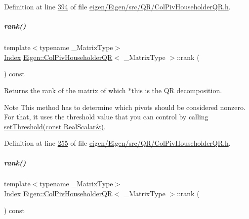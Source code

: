 Definition at line \hyperlink{eigen_2_eigen_2src_2_q_r_2_col_piv_householder_q_r_8h_source_l00394}{394} of file \hyperlink{eigen_2_eigen_2src_2_q_r_2_col_piv_householder_q_r_8h_source}{eigen/\+Eigen/src/\+Q\+R/\+Col\+Piv\+Householder\+Q\+R.\+h}.

\mbox{\label{group___q_r___module_a2a59aaa689613ce5ef0c9130ad33940e}} 
\subparagraph{\texorpdfstring{rank()}{rank()}\hspace{0.1cm}{\footnotesize\ttfamily [1/2]}}
{\footnotesize\ttfamily template$<$typename \+\_\+\+Matrix\+Type$>$ \\
\hyperlink{namespace_eigen_a62e77e0933482dafde8fe197d9a2cfde}{Index} \hyperlink{group___q_r___module_class_eigen_1_1_col_piv_householder_q_r}{Eigen\+::\+Col\+Piv\+Householder\+QR}$<$ \+\_\+\+Matrix\+Type $>$\+::rank (\begin{DoxyParamCaption}{ }\end{DoxyParamCaption}) const\hspace{0.3cm}{\ttfamily [inline]}}

\begin{DoxyReturn}{Returns}
the rank of the matrix of which $\ast$this is the QR decomposition.
\end{DoxyReturn}
\begin{DoxyNote}{Note}
This method has to determine which pivots should be considered nonzero. For that, it uses the threshold value that you can control by calling \hyperlink{group___q_r___module_ae712cdc9f0e521cfc8061bee58ff55ee}{set\+Threshold(const Real\+Scalar\&)}. 
\end{DoxyNote}


Definition at line \hyperlink{eigen_2_eigen_2src_2_q_r_2_col_piv_householder_q_r_8h_source_l00255}{255} of file \hyperlink{eigen_2_eigen_2src_2_q_r_2_col_piv_householder_q_r_8h_source}{eigen/\+Eigen/src/\+Q\+R/\+Col\+Piv\+Householder\+Q\+R.\+h}.

\mbox{\label{group___q_r___module_a2a59aaa689613ce5ef0c9130ad33940e}} 
\subparagraph{\texorpdfstring{rank()}{rank()}\hspace{0.1cm}{\footnotesize\ttfamily [2/2]}}
{\footnotesize\ttfamily template$<$typename \+\_\+\+Matrix\+Type$>$ \\
\hyperlink{namespace_eigen_a62e77e0933482dafde8fe197d9a2cfde}{Index} \hyperlink{group___q_r___module_class_eigen_1_1_col_piv_householder_q_r}{Eigen\+::\+Col\+Piv\+Householder\+QR}$<$ \+\_\+\+Matrix\+Type $>$\+::rank (\begin{DoxyParamCaption}{ }\end{DoxyParamCaption}) const\hspace{0.3cm}{\ttfamily [inline]}}

